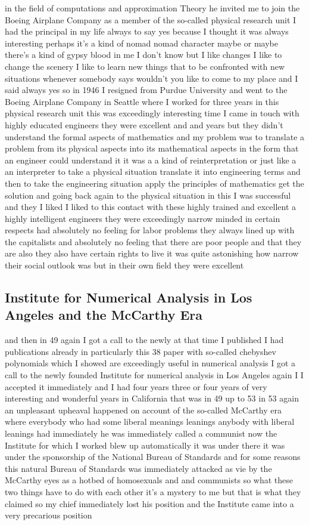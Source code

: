 \documentclass{article}
\begin{document}
in the field of computations and approximation Theory he invited me to join the Boeing Airplane Company as a member of the so-called physical research unit I had the principal in my life always to say yes because I thought it was always interesting perhaps it's a kind of nomad nomad character maybe or maybe there's a kind of gypsy blood in me I don't know but I like changes I like to change the scenery I like to learn new things that to be confronted with new situations whenever somebody says wouldn't you like to come to my place and I said always yes so in 1946 I resigned from Purdue University and went to the Boeing Airplane Company in Seattle where I worked for three years in this physical research unit this was exceedingly interesting time I came in touch with highly educated engineers they were excellent and and years but they didn't understand the formal aspects of mathematics and my problem was to translate a problem from its physical aspects into its mathematical aspects in the form that an engineer could understand it it was a a kind of reinterpretation or just like a an interpreter to take a physical situation translate it into engineering terms and then to take the engineering situation apply the principles of mathematics get the solution and going back again to the physical situation in this I was successful and they I liked I liked to this contact with these highly trained and excellent a highly intelligent engineers they were exceedingly narrow minded in certain respects had absolutely no feeling for labor problems they always lined up with the capitalists and absolutely no feeling that there are poor people and that they are also they also have certain rights to live it was quite astonishing how narrow their social outlook was but in their own field they were excellent

\subsection{Institute for Numerical Analysis in Los Angeles and the McCarthy Era}
and then in 49 again I got a call to the newly at that time I published I had publications already in particularly this 38 paper with so-called chebyshev polynomials which I showed are exceedingly useful in numerical analysis I got a call to the newly founded Institute for numerical analysis in Los Angeles again I I accepted it immediately and I had four years three or four years of very interesting and wonderful years in California that was in 49 up to 53 in 53 again an unpleasant upheaval happened on account of the so-called McCarthy era where everybody who had some liberal meanings leanings anybody with liberal leanings had immediately he was immediately called a communist now the Institute for which I worked blew up automatically it was under there it was under the sponsorship of the National Bureau of Standards and for some reasons this natural Bureau of Standards was immediately attacked as vie by the McCarthy eyes as a hotbed of homosexuals and and communists so what these two things have to do with each other it's a mystery to me but that is what they claimed so my chief immediately lost his position and the Institute came into a very precarious position
\end{document}
